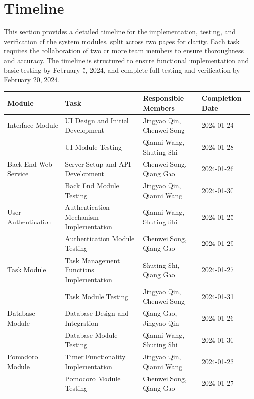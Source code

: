 \documentclass[12pt, titlepage]{article}
\begin{document}
\section{Timeline}

This section provides a detailed timeline for the implementation, testing, and verification of the system modules, split across two pages for clarity. Each task requires the collaboration of two or more team members to ensure thoroughness and accuracy. The timeline is structured to ensure functional implementation and basic testing by February 5, 2024, and complete full testing and verification by February 20, 2024.

\begin{table}[H]
\centering
\begin{tabular}{|p{}|p{}|p{}|p{}|}
\hline
\textbf{Module} & \textbf{Task} & \textbf{Responsible Members} & \textbf{Completion Date} \\
\hline
Interface Module & UI Design and Initial Development & Jingyao Qin, Chenwei Song & 2024-01-24 \\
\hline
 & UI Module Testing & Qianni Wang, Shuting Shi & 2024-01-28 \\
\hline
Back End Web Service & Server Setup and API Development & Chenwei Song, Qiang Gao & 2024-01-26 \\
\hline
 & Back End Module Testing & Jingyao Qin, Qianni Wang & 2024-01-30 \\
\hline
User Authentication & Authentication Mechanism Implementation & Qianni Wang, Shuting Shi & 2024-01-25 \\
\hline
 & Authentication Module Testing & Chenwei Song, Qiang Gao & 2024-01-29 \\
\hline
Task Module & Task Management Functions Implementation & Shuting Shi, Qiang Gao & 2024-01-27 \\
\hline
 & Task Module Testing & Jingyao Qin, Chenwei Song & 2024-01-31 \\
\hline
Database Module & Database Design and Integration & Qiang Gao, Jingyao Qin & 2024-01-26 \\
\hline
 & Database Module Testing & Qianni Wang, Shuting Shi & 2024-01-30 \\
\hline
Pomodoro Module & Timer Functionality Implementation & Jingyao Qin, Qianni Wang & 2024-01-23 \\
\hline
 & Pomodoro Module Testing & Chenwei Song, Qiang Gao & 2024-01-27 \\

\end{tabular}
\end{table}
\end{document}
